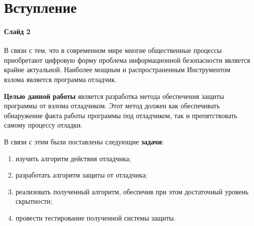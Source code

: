 
\section{Вступление}

\paragraph{Слайд 2}\mbox{}\par
В связи с тем, что в современном мире многие общественные процессы приобретают
цифровую форму проблема информационной безопасности является крайне актуальной.
Наиболее мощным и распространенным Инструментом взлома является программа
отладчик.

\textbf{Целью данной работы} является разработка метода обеспечения защиты
программы от взлома отладчиком. Этот метод должен как обеспечивать обнаружение
факта работы программы под отладчиком, так и препятствовать самому процессу
отладки.

В связи с этим были поставлены следующие \textbf{задачи}:
\begin{enumerate}
  \item изучить алгоритм действия отладчика;
  \item разработать алгоритм защиты от отладчика;
  \item реализовать полученный алгоритм, обеспечив при этом достаточный уровень
    скрытности;
  \item провести тестирование полученной системы защиты.
\end{enumerate}


